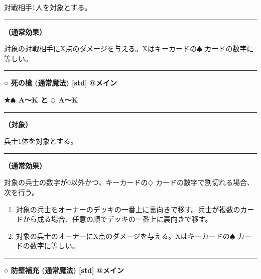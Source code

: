 \documentclass[twocolumn,a5paper,papersize,10pt]{jarticle}
\begin{document}
対戦相手1人を対象とする。
\vspace{1mm}%
\hrule height 0.1mm depth 0mm width 66.5mm %
\vspace{1mm}%

{\bf（通常効果）}

対象の対戦相手にX点のダメージを与える。Xはキーカードの{\normalsize $\spadesuit$} カードの数字に等しい。
\vspace{2mm} %
\hrule height 0.5mm depth 0mm width 66.5mm %
\vspace{1mm} %
{\small\bf ○ 死の槍 {\scriptsize (通常魔法) [std]}} %
\hfill 
{\footnotesize\bf @メイン }

{\footnotesize\bf ★{\normalsize $\spadesuit$} A〜K と {\normalsize $\diamondsuit$} A〜K}

\vspace{1mm}%
\hrule height 0.1mm depth 0mm width 66.5mm %
\vspace{1mm}%
{\bf（対象）}

兵士1体を対象とする。
\vspace{1mm}%
\hrule height 0.1mm depth 0mm width 66.5mm %
\vspace{1mm}%

{\bf（通常効果）}

対象の兵士の数字が0以外かつ、キーカードの{\normalsize $\diamondsuit$} カードの数字で割切れる場合、次を行う。


\vspace{-1zh}%
\begin{enumerate}
\setlength{\leftskip}{-0.3cm}
\setlength{\parskip}{0pt} %

\item 対象の兵士をオーナーのデッキの一番上に裏向きで移す。兵士が複数のカードから成る場合、任意の順でデッキの一番上に裏向きで移す。

\item 対象の兵士のオーナーにX点のダメージを与える。Xはキーカードの{\normalsize $\spadesuit$} カードの数字に等しい。
\vspace{-1zh}%
\end{enumerate}
\vspace{2mm} %
\hrule height 0.5mm depth 0mm width 66.5mm %
\vspace{1mm} %
{\small\bf ○ 防壁補充 {\scriptsize (通常魔法) [std]}} %
\hfill 
{\footnotesize\bf @メイン }
\end{document}
